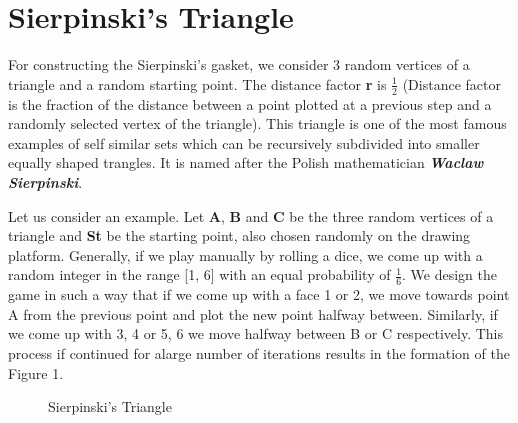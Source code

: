\documentclass{article}
\begin{document}
\section{Sierpinski's Triangle}
For constructing the Sierpinski's gasket, we consider 3 random vertices of a triangle and a random starting point. The distance factor \textbf{r} is $\frac{1}{2}$ (Distance factor is the fraction of the distance between a point plotted at a previous step and a randomly selected vertex of the triangle). This triangle is one of the most famous examples of self similar sets which can be recursively subdivided into smaller equally shaped trangles. It is named after the Polish mathematician \textbf{\textit{Waclaw Sierpinski}}.\\ \par

Let us consider an example. Let \textbf{A}, \textbf{B} and \textbf{C} be the three random vertices of a triangle and \textbf{St} be the starting point, also chosen randomly on the drawing platform. Generally, if we play manually by rolling a dice, we come up with a random integer in the range [1, 6] with an equal probability of $\frac{1}{6}$. We design the game in such a way that if we come up with a face 1 or 2, we move towards point A from the previous point and plot the new point halfway between. Similarly, if we come up with 3, 4 or 5, 6 we move halfway between B or C respectively. This process if continued for alarge number of iterations results in the formation of the Figure 1.

\begin{figure}[H]
\centering 
\noindent{}%
\caption{Sierpinski's Triangle}
\end{figure}
\end{document}
